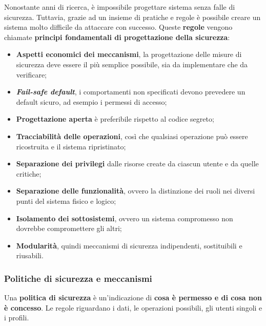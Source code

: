 \documentclass[a4paper]{article}
\begin{document}
	Nonostante anni di ricerca, è impossibile progettare sistema senza falle di sicurezza. Tuttavia, grazie ad un insieme di pratiche e regole è possibile creare un sistema molto difficile da attaccare con successo. Queste \textbf{regole} vengono chiamate \textcolor{Red3}{\textbf{principi fondamentali di progettazione della sicurezza}}:
	\begin{itemize}
		\item \textbf{Aspetti economici dei meccanismi}, la progettazione delle misure di sicurezza deve essere il più semplice possibile, sia da implementare che da verificare;
		
		\item \textbf{\emph{Fail-safe default}}, i comportamenti non specificati devono prevedere un default sicuro, ad esempio i permessi di accesso;
		
		\item \textbf{Progettazione aperta} è preferibile rispetto al codice segreto;
		
		\item \textbf{Tracciabilità delle operazioni}, così che qualsiasi operazione può essere ricostruita e il sistema ripristinato;
		
		\item \textbf{Separazione dei privilegi} dalle risorse create da ciascun utente e da quelle critiche;
		
		\item \textbf{Separazione delle funzionalità}, ovvero la distinzione dei ruoli nei diversi punti del sistema fisico e logico;
		
		\item \textbf{Isolamento dei sottosistemi}, ovvero un sistema compromesso non dovrebbe compromettere gli altri;
		
		\item \textbf{Modularità}, quindi meccanismi di sicurezza indipendenti, sostituibili e riusabili.
	\end{itemize}\newpage
	
	\subsubsection{Politiche di sicurezza e meccanismi}
	
	Una \textcolor{Red3}{\textbf{politica di sicurezza}} è un'indicazione di \textbf{cosa è permesso e di cosa non è concesso}. Le regole riguardano i dati, le operazioni possibili, gli utenti singoli e i profili.\newline
	
\end{document}
